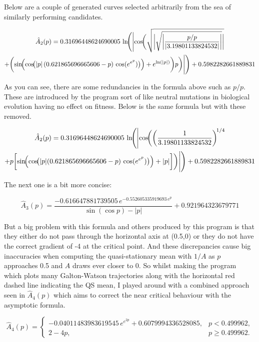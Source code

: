 \documentclass[11pt]{article}
\begin{document}
Below are a couple of generated curves selected arbitrarily from the sea of similarly performing candidates.

\begin{multline*}
\hat A_2(p) = 0.31696448624690005 \,
\ln\!\Biggl(
\Biggl|
\cos\!\biggl(
\sqrt{
\biggl|
\sqrt{
\biggl|
\frac{p/p}{| 3.19801133824532 |}
\biggr|
}
\biggr|
} \\
+
\biggl(
\sin\!\Bigl(
\cos\!\bigl(
|p| \,
(0.621865696665606 - p)\,
\cos(e^{e^{p}})
\bigr)
\Bigr)
+
e^{\ln(|p|)}
\biggr) p
\biggr)
\Biggr|
\Biggr)
+ 0.5982282661889831
\end{multline*}

\noindent
As you can see, there are some redundancies in the formula above such as $p/p$. These are introduced by the program sort of like neutral mutations in biological evolution having no effect on fitness. Below is the same formula but with these removed.

\begin{multline*}
\hat A_2(p) = 0.31696448624690005 \,
\ln\!\Biggl(
\Biggl|
\cos\!\biggl(
\left( \frac{1}{3.19801133824532} \right)^{\!1/4} \\
+
p \biggl[
\sin\!\Bigl(
\cos\!\bigl(
|p| (0.621865696665606 - p)\,
\cos(e^{e^{p}})
\bigr)
\Bigr)
+
|p|
\biggr]
\biggr)
\Biggr|
\Biggr)
+ 0.5982282661889831
\end{multline*}

\noindent
The next one is a bit more concise:

\[
\hat A_3(p)  = \frac{-0.616647881739505 \, e^{-0.552605335919693 \, e^p}}{\sin(\cos p) - |p|} + 0.921964323679771
\]

\noindent
But a big problem with this formula and others produced by this program is that they either do not pass through the horizontal axis at (0.5,0) or they do not have the correct gradient of -4 at the critical point. And these discrepancies cause big inaccuracies when computing the quasi-stationary mean with $1/A$ as $p$ approaches 0.5 and $A$ draws ever closer to 0. So whilst making the program which plots many Galton-Watson trajectories along with the horizontal red dashed line indicating the QS mean, I played around with a combined approach seen in $\hat A_4(p)$ which aims to correct the near critical behaviour with the asymptotic formula. 


\[
\hat A_4(p) = 
\begin{cases}
-0.04011483983619545\, e^{e^{2p}} + 0.6079994336528085, & p < 0.499962,\\[2mm]
2 - 4p, & p \ge 0.499962.
\end{cases}
\]
\end{document}
